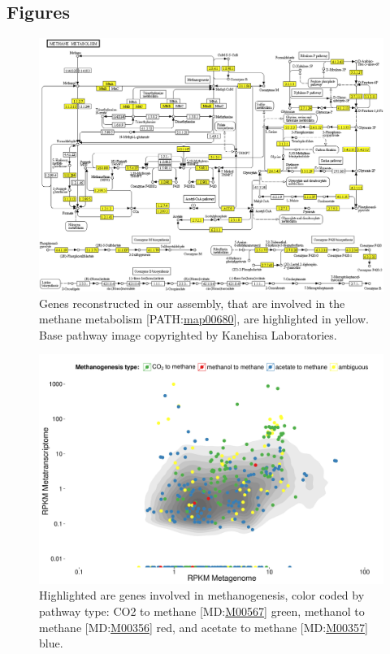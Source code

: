 \documentclass{bmcart}
\begin{document}
\begin{backmatter}
\section*{Figures}
\begin{figure}[h!]
\centering
\includegraphics[width=.9\textwidth]{map00680_cropped}
\caption{ Genes reconstructed in our assembly, that are involved in the methane metabolism [PATH:\href{http://www.genome.jp/kegg-bin/show_pathway?map00680}{map00680}], are highlighted in yellow.
Base pathway image copyrighted by Kanehisa Laboratories.}
\label{fPathway}
\end{figure}
\begin{figure}[h!]
\centering
\includegraphics[width=.9\textwidth]{Rplot}
\caption{ Highlighted are genes involved in methanogenesis, color coded by pathway type: CO2 to methane [MD:\href{http://www.kegg.jp/kegg-bin/show_module?M00567}{M00567}] green, methanol to methane [MD:\href{http://www.kegg.jp/kegg-bin/show_module?M00356}{M00356}] red, and acetate to methane [MD:\href{http://www.kegg.jp/kegg-bin/show_module?M00357}{M00357}] blue.}
\label{fCoverage}
\end{figure}


\end{backmatter}
\end{document}
